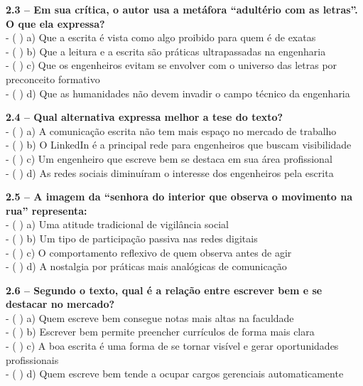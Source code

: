 \documentclass[
  12pt,
]{article}
\begin{document}
\vspace{0.5cm}

\textbf{2.3 -- Em sua crítica, o autor usa a metáfora ``adultério com as
letras''. O que ela expressa?}\\
- ( ) a) Que a escrita é vista como algo proibido para quem é de
exatas\\
- ( ) b) Que a leitura e a escrita são práticas ultrapassadas na
engenharia\\
- ( ) c) Que os engenheiros evitam se envolver com o universo das letras
por preconceito formativo\\
- ( ) d) Que as humanidades não devem invadir o campo técnico da
engenharia

\vspace{0.5cm}

\textbf{2.4 -- Qual alternativa expressa melhor a tese do texto?}\\
- ( ) a) A comunicação escrita não tem mais espaço no mercado de
trabalho\\
- ( ) b) O LinkedIn é a principal rede para engenheiros que buscam
visibilidade\\
- ( ) c) Um engenheiro que escreve bem se destaca em sua área
profissional\\
- ( ) d) As redes sociais diminuíram o interesse dos engenheiros pela
escrita

\vspace{0.5cm}

\textbf{2.5 -- A imagem da ``senhora do interior que observa o movimento
na rua'' representa:}\\
- ( ) a) Uma atitude tradicional de vigilância social\\
- ( ) b) Um tipo de participação passiva nas redes digitais\\
- ( ) c) O comportamento reflexivo de quem observa antes de agir\\
- ( ) d) A nostalgia por práticas mais analógicas de comunicação

\vspace{0.5cm}

\textbf{2.6 -- Segundo o texto, qual é a relação entre escrever bem e se
destacar no mercado?}\\
- ( ) a) Quem escreve bem consegue notas mais altas na faculdade\\
- ( ) b) Escrever bem permite preencher currículos de forma mais clara\\
- ( ) c) A boa escrita é uma forma de se tornar visível e gerar
oportunidades profissionais\\
- ( ) d) Quem escreve bem tende a ocupar cargos gerenciais
automaticamente
\end{document}

